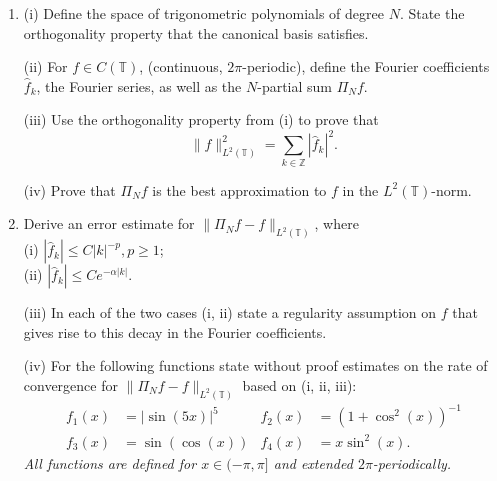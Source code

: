 \documentclass{exams}
\newcommand{\Z}{\mathbb{Z}}
\begin{document}

\def\TT{\mathbb{T}}

\begin{examcomp1}

\clearpage

\begin{question}
  \begin{enumerate}

  \item  (i) Define the space of trigonometric polynomials of degree $N$. State
  the orthogonality property that the canonical basis satisfies.   

  (ii) For $f \in C(\TT)$, (continuous, $2\pi$-periodic), define the
  Fourier coefficients $\hat{f}_k$, the Fourier series, as well as the
  $N$-partial sum $\Pi_N f$.  
  
  (iii) Use the orthogonality property from (i) to prove that  
  \[
      \| f \|_{L^2(\TT)}^2 = \sum_{k \in \Z} |\hat{f}_k|^2.  
  \]
  
  (iv) Prove that $\Pi_N f$ is the best approximation to 
  $f$ in the $L^2(\TT)$-norm.  

  \item  Derive an
  error estimate for $\| \Pi_N f - f \|_{L^2(\TT)}$, where  \\ 
  (i) $|\hat{f}_k| \leq C |k|^{-p}, p \geq 1$;  \\  
  (ii) $|\hat{f}_k| \leq C e^{-\alpha |k|}$.   

  (iii) In each of the two cases (i, ii) state a regularity assumption on 
  $f$ that gives rise to this decay in the Fourier coefficients. 

  (iv) For the following functions state without proof estimates on the rate of
  convergence for $\| \Pi_N f - f \|_{L^2(\TT)}$ based on (i, ii, iii):  
  \begin{align*}
    f_1(x) &= |\sin(5x)|^5
    & 
    f_2(x) &= (1 + \cos^2(x))^{-1}
    \\ 
    f_3(x) &= \sin(\cos(x))
    &
    f_4(x) &= x \sin^2(x).
  \end{align*}
  {\it All functions are defined for $x \in (-\pi, \pi]$ and 
  extended $2\pi$-periodically.}


\end{enumerate}
\end{question}
\end{examcomp1}
\end{document}
